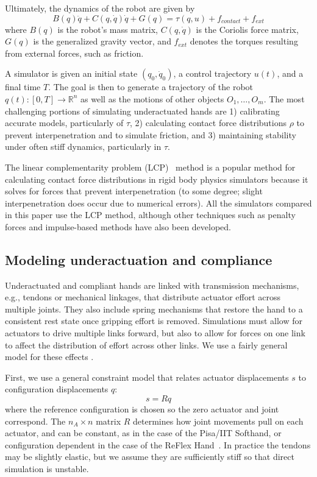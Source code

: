 Ultimately, the dynamics of the robot are given by
\begin{equation}
\label{eq:Dynamics}
B(q)\ddot{q} + C(q,\dot{q})\dot{q} + G(q) = \tau(q,u) + f_{contact} + f_{ext}
\end{equation}
where $B(q)$ is the robot's mass matrix, $C(q,\dot{q})$ is the Coriolis force matrix, $G(q)$ is the generalized gravity vector, and $f_{ext}$ denotes the torques resulting from external forces, such as friction.

A simulator is given an initial state $(q_0,\dot{q}_0)$, a control trajectory $u(t)$, and a final time $T$.  The goal is then to generate a trajectory of the robot $q(t):[0,T]\rightarrow \mathbb{R}^n$ as well as the motions of other objects $O_1,\ldots,O_m$. The most challenging portions of simulating underactuated hands are 1) calibrating accurate models, particularly of $\tau$, 2) calculating contact force distributions $\rho$ to prevent interpenetration and to simulate friction, and 3) maintaining stability under often stiff dynamics, particularly in $\tau$.

The linear complementarity problem (LCP)~\cite{Anitescu97} method is a popular method for calculating contact force distributions in rigid body physics simulators because it solves for forces that prevent interpenetration (to some degree; slight interpenetration does occur due to numerical errors).  All the simulators compared in this paper use the LCP method, although other techniques such as penalty forces and impulse-based methods have also been developed.


\subsection{Modeling underactuation and compliance}

Underactuated and compliant hands are linked with transmission mechanisms, e.g., tendons or mechanical linkages, that distribute actuator effort across multiple joints. They also include spring mechanisms that restore the hand to a consistent rest state once gripping effort is removed.  Simulations must allow for actuators to drive multiple links forward, but also to allow for forces on one link to affect the distribution of effort across other links. We use a fairly general model for these effects \cite{Grioli12}.

First, we use a general constraint model that relates actuator displacements $s$ to configuration displacements $q$:
\begin{equation}
\label{eq:quasi_static_equilibrium_0}
s = R q
\end{equation}
where the reference configuration is chosen so the zero actuator and joint correspond. The $n_A \times n$ matrix $R$ determines how joint movements pull on each actuator, and can be constant, as in the case of the Pisa/IIT Softhand, or configuration dependent in the case of the ReFlex Hand~\cite{Birglen11}.  In practice the tendons may be slightly elastic, but we assume they are sufficiently stiff so that direct simulation is unstable. 

